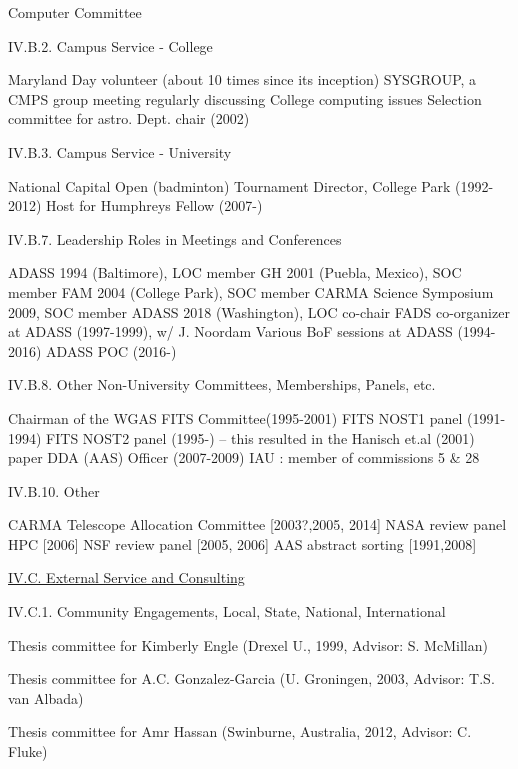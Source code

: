 \documentclass[11pt,letterpaper]{article}
\newcommand{\newi}{\newline\indent}
\begin{document}
Computer Committee

IV.B.2. Campus Service - College

Maryland Day volunteer (about 10 times since its inception)\newi
SYSGROUP, a CMPS group meeting regularly discussing College computing issues\newi
Selection committee for astro. Dept. chair (2002)\newi

IV.B.3. Campus Service - University
                
National Capital Open  (badminton) Tournament Director, College Park (1992-2012)\newi
Host for Humphreys Fellow (2007-)\newi





IV.B.7. Leadership Roles in Meetings and Conferences

ADASS 1994 (Baltimore), LOC member\newi
GH 2001 (Puebla, Mexico), SOC member\newi
FAM 2004 (College Park), SOC member\newi
CARMA Science Symposium 2009, SOC member\newi
ADASS 2018 (Washington), LOC co-chair\newi
FADS co-organizer at ADASS (1997-1999), w/ J. Noordam\newi
Various BoF sessions at ADASS (1994-2016)\newi      
ADASS POC (2016-)\newi

IV.B.8. Other Non-University Committees, Memberships, Panels, etc.

Chairman of the WGAS FITS Committee(1995-2001)\newi
FITS NOST1 panel (1991-1994) \newi
FITS NOST2 panel (1995-) -- this resulted in the Hanisch et.al (2001) paper\newi
DDA (AAS) Officer (2007-2009)\newi
IAU : member of commissions 5 \& 28\newi


IV.B.10. Other

CARMA Telescope Allocation Committee [2003?,2005, 2014]\newi
NASA review panel HPC [2006]\newi
NSF review panel  [2005, 2006]\newi
AAS abstract sorting [1991,2008]\newi


\underline{IV.C. External Service and Consulting}

IV.C.1. Community Engagements, Local, State, National, International

Thesis committee for Kimberly Engle (Drexel U., 1999, Advisor: S. McMillan)

Thesis committee for  A.C. Gonzalez-Garcia (U. Groningen, 2003, Advisor: T.S. van Albada) 

Thesis committee for Amr Hassan (Swinburne, Australia, 2012, Advisor: C. Fluke)
\end{document}
